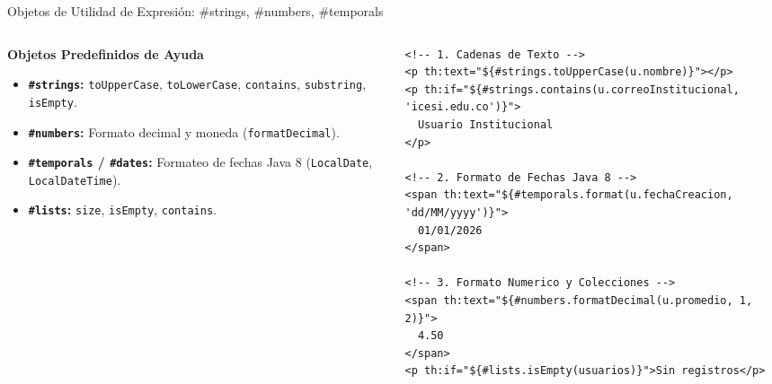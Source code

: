 \documentclass[aspectratio=169]{beamer}
\begin{document}
\begin{frame}[fragile]{Objetos de Utilidad de Expresi\'on: \#strings, \#numbers, \#temporals}
\begin{columns}[c]
\begin{column}{0.48\textwidth}
  \textbf{Objetos Predefinidos de Ayuda}
  \begin{itemize}
    \item \textbf{\texttt{\#strings}:} \texttt{toUpperCase}, \texttt{toLowerCase}, \texttt{contains}, \texttt{substring}, \texttt{isEmpty}.
    \item \textbf{\texttt{\#numbers}:} Formato decimal y moneda (\texttt{formatDecimal}).
    \item \textbf{\texttt{\#temporals} / \texttt{\#dates}:} Formateo de fechas Java 8 (\texttt{LocalDate}, \texttt{LocalDateTime}).
    \item \textbf{\texttt{\#lists}:} \texttt{size}, \texttt{isEmpty}, \texttt{contains}.
  \end{itemize}
\end{column}
\begin{column}{0.50\textwidth}
\begin{lstlisting}[style=ThymeleafStyle]
<!-- 1. Cadenas de Texto -->
<p th:text="${#strings.toUpperCase(u.nombre)}"></p>
<p th:if="${#strings.contains(u.correoInstitucional, 'icesi.edu.co')}">
  Usuario Institucional
</p>

<!-- 2. Formato de Fechas Java 8 -->
<span th:text="${#temporals.format(u.fechaCreacion, 'dd/MM/yyyy')}">
  01/01/2026
</span>

<!-- 3. Formato Numerico y Colecciones -->
<span th:text="${#numbers.formatDecimal(u.promedio, 1, 2)}">
  4.50
</span>
<p th:if="${#lists.isEmpty(usuarios)}">Sin registros</p>
\end{lstlisting}
\end{column}
\end{columns}
\end{frame}
\end{document}
